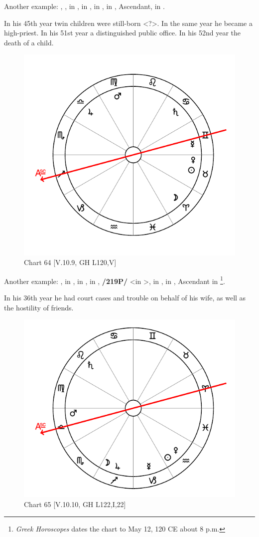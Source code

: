 \noindent Another example: \Sun, \Mercury, \Saturn\xspace in \Sagittarius, \Moon in \Pisces, \Mars\xspace in \Leo, \Venus\xspace in \Capricorn, Ascendant, \Jupiter\xspace in \Taurus. 

In his 45th year twin children were still-born <?>. In the same
year he became a high-priest. In his 51st year a distinguished public office. In his 52nd year the death of a child. 

\begin{figure}
\centering
\vspace{-20pt}
\includegraphics[width=.68\textwidth]{charts/5_10_09}
\caption{Chart 64 [V.10.9, GH L120,V]}
\label{fig:chart64}
\end{figure}

\noindent Another example: \Sun, \Venus\xspace in \Taurus, \Moon\xspace in \Aries, \Saturn\xspace in \Cancer, \textbf{/219P/} \Jupiter <in \Libra>, \Mars\xspace in \Virgo, \Mercury\xspace in \Gemini, Ascendant in \Sagittarius\footnote{\textit{Greek Horoscopes} dates the chart to May 12, 120 CE about 8 p.m.}. 

In his 36th year he had court cases and trouble on behalf of his wife, as well as the hostility of friends.

\begin{figure}
\centering
\vspace{-20pt}
\includegraphics[width=.68\textwidth]{charts/5_10_10}
\caption{Chart 65 [V.10.10, GH L122,I,22]}
\label{fig:chart65}
\end{figure}

